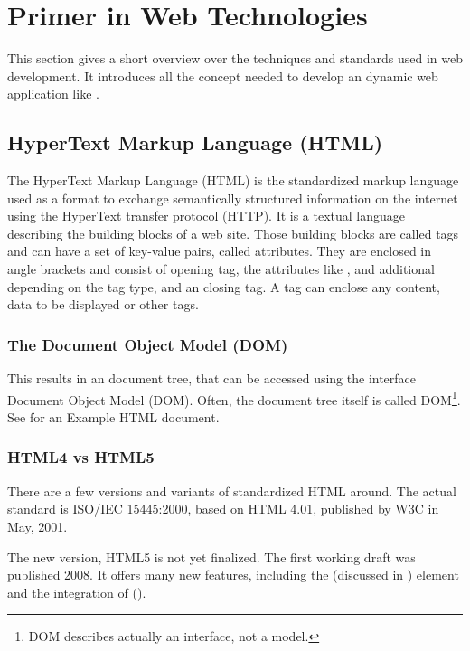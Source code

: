 \section{Primer in Web Technologies}

This section gives a short overview over the techniques and standards used in web development.
It introduces all the concept needed to develop an dynamic web application like \spl.



\subsection{HyperText Markup Language (HTML)}
The HyperText Markup Language (HTML) is the standardized markup language used as a format to exchange semantically structured information on the internet using the HyperText transfer protocol (HTTP).
It is a textual language describing the building blocks of a web site.
Those building blocks are called tags and can have a set of key-value pairs, called attributes.
They are enclosed in angle brackets and consist of opening tag, the attributes like ,  and additional depending on the tag type, and an closing tag.
A tag can enclose any content, data to be displayed or other tags.


\subsubsection{The Document Object Model (DOM)}
This results in an document tree, that can be accessed using the interface Document Object Model (DOM).
Often, the document tree itself is called DOM\footnote{DOM describes actually an interface, not a model.}.
See  for an Example HTML document.

\subsubsection{HTML4 vs HTML5}

There are a few versions and variants of standardized HTML around. The actual standard is ISO/IEC 15445:2000\cite{isohtml}, based on HTML 4.01, published by W3C in May, 2001.

The new version, HTML5 is not yet finalized.
The first working draft was published 2008\cite{html5_draft}.
It offers many new features, including the  (discussed in ) element and the integration of  ().


